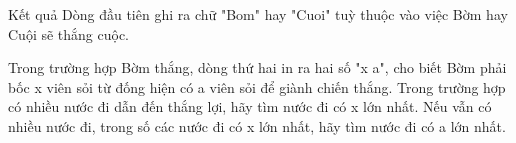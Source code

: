 Kết quả
Dòng đầu tiên ghi ra chữ "Bom" hay "Cuoi" tuỳ thuộc vào việc Bờm hay Cuội sẽ thắng cuộc.  

   Trong trường hợp Bờm thắng, dòng thứ hai in ra hai số "x a", cho biết Bờm phải bốc x viên sỏi từ đống hiện có a viên sỏi để giành chiến thắng. Trong trường hợp có nhiều nước đi dẫn đến thắng lợi, hãy tìm nước đi có x lớn nhất. Nếu vẫn có nhiều nước đi, trong số các nước đi có x lớn nhất, hãy tìm nước đi có a lớn nhất.